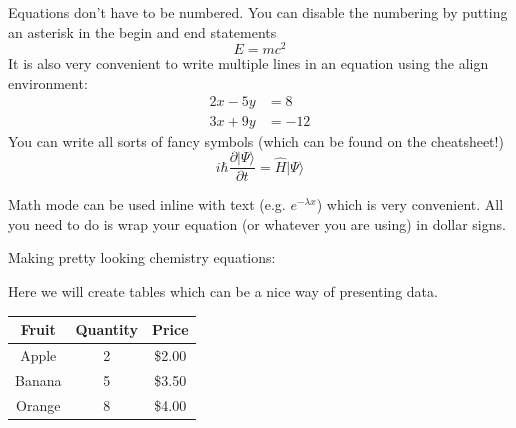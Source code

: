 \documentclass[a4paper]{article}
\begin{document}
Equations don't have to be numbered. You can disable the numbering by putting 
an asterisk in the begin and end statements 
\begin{equation*}
E=mc^{2}
\end{equation*}
It is also very convenient to write multiple lines in an equation using 
the align environment:
\begin{align*}
2x - 5y &=  8 \\ 
3x + 9y &=  -12
\end{align*}
You can write all sorts of fancy symbols (which can be found on the cheatsheet!)
\begin{equation*}
i\hbar \frac{\partial | \Psi \rangle}{ \partial t}=\hat{H}|\Psi \rangle
\end{equation*}
\newpage

Math mode can be used inline with text (e.g. $e^{-\lambda x}$) which is very 
convenient. All you need to do is wrap your equation (or whatever you are using)
in dollar signs. 


Making pretty looking chemistry equations:


\newpage


Here we will create tables which can be a nice way of presenting data. 

\begin{center}
\begin{tabular} { c  c  c }
\toprule
Fruit & Quantity & Price \\ \midrule
Apple & 2 & \$2.00 \\ \midrule
Banana & 5 & \$3.50 \\ \midrule
Orange & 8 & \$4.00 \\ 
\bottomrule

\end{tabular}
\end{center}

\newpage
\end{document}
